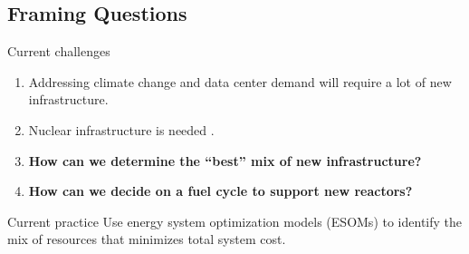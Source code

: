 \subsection{Framing Questions}
\begin{frame}
    \begin{block}{Current challenges}
    \begin{enumerate}[<+->]
        \item Addressing climate change and data center demand will require a lot of new infrastructure.
        \item Nuclear infrastructure is needed \cite{julie_kozeracki_pathways_2024}.
        \item \textbf{How can we determine the ``best'' mix of new infrastructure?}
        \item \textbf{How can we decide on a fuel cycle to support new reactors?}
    \end{enumerate}    
    \end{block}
    \pause
    \begin{block}{Current practice}
        Use energy system optimization models (ESOMs) to identify the mix of resources that minimizes total system cost.
    \end{block}
\end{frame}